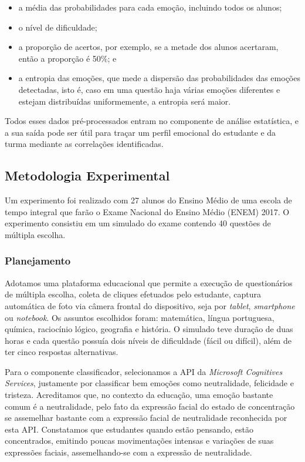 \begin{itemize}
 \item a média das probabilidades para cada emoção, incluindo todos os alunos;
 \item o nível de dificuldade;
 \item a proporção de acertos, por exemplo, se a metade dos alunos acertaram, então a
proporção é 50\%; e
 \item a entropia das emoções, que mede a dispersão das probabilidades das emoções
detectadas, isto é, caso em uma questão haja várias emoções diferentes e estejam
distribuídas uniformemente, a entropia será maior.
\end{itemize}
Todos esses dados pré-processados entram no componente de análise estatística,
e a sua saída pode ser útil para traçar um perfil emocional do estudante e da turma
mediante as correlações identificadas.

\subsection{Metodologia Experimental}
Um experimento foi realizado com 27 alunos do Ensino Médio de uma escola de tempo integral que farão o Exame Nacional do Ensino Médio (ENEM) 2017. O experimento consistiu em um simulado do exame contendo 40 questões de múltipla escolha.

\subsubsection{Planejamento}\label{sec:plan}
Adotamos uma plataforma educacional que permite a execução de questionários de múltipla escolha, coleta de cliques efetuados pelo estudante, captura automática de foto via câmera frontal do dispositivo, seja por \textit{tablet}, \textit{smartphone} ou \textit{notebook}. Os assuntos escolhidos foram: matemática, língua portuguesa, química, raciocínio lógico, geografia e história. O simulado teve duração de duas horas e cada questão possuía dois níveis de dificuldade (fácil ou difícil), além de ter cinco respostas alternativas.

Para o componente classificador, selecionamos a API da \textit{Microsoft Cognitives Services}, justamente por classificar bem emoções como neutralidade, felicidade e tristeza. Acreditamos que, no contexto da educação, uma emoção bastante comum é a neutralidade, pelo fato da expressão facial do estado de concentração se assemelhar bastante com a expressão facial de neutralidade reconhecida por esta API. Constatamos que estudantes quando estão pensando, estão concentrados, emitindo poucas movimentações intensas e variações de suas expressões faciais, assemelhando-se com a expressão de neutralidade.

